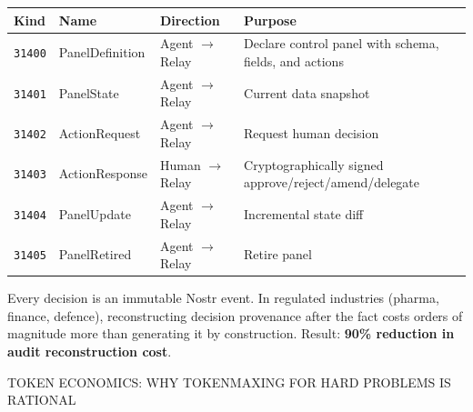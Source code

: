 \documentclass[10pt,a4paper]{article}
\newcommand{\sectiontag}[1]{%
  \vspace{6pt}%
  {\footnotesize\color{gold}\MakeUppercase{#1}}\\[-1pt]%
}
\begin{document}
{\small
\begin{tabularx}{\linewidth}{@{}lllX@{}}
  \toprule
  \textbf{\color{textmuted}Kind} & \textbf{\color{textmuted}Name} & \textbf{\color{textmuted}Direction} & \textbf{\color{textmuted}Purpose} \\
  \midrule
  \texttt{31400} & PanelDefinition & Agent $\to$ Relay & Declare control panel with schema, fields, and actions \\
  \texttt{31401} & PanelState & Agent $\to$ Relay & Current data snapshot \\
  \texttt{31402} & ActionRequest & Agent $\to$ Relay & Request human decision \\
  \texttt{31403} & ActionResponse & Human $\to$ Relay & Cryptographically signed approve/reject/amend/delegate \\
  \texttt{31404} & PanelUpdate & Agent $\to$ Relay & Incremental state diff \\
  \texttt{31405} & PanelRetired & Agent $\to$ Relay & Retire panel \\
  \bottomrule
\end{tabularx}
}

\vspace{2pt}
{\small Every decision is an immutable Nostr event. In regulated industries (pharma, finance, defence), reconstructing decision provenance after the fact costs orders of magnitude more than generating it by construction. Result: \textbf{90\% reduction in audit reconstruction cost}.}

\sectiontag{Token Economics: Why Tokenmaxing for Hard Problems Is Rational}
\end{document}
